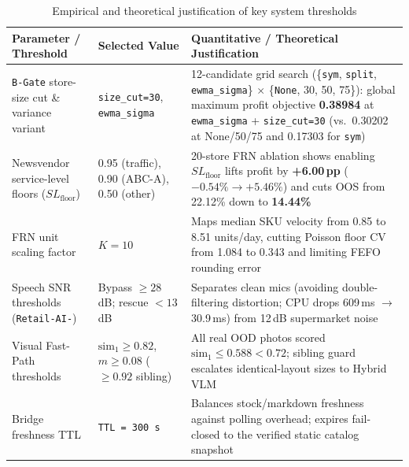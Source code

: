 \begin{table}[H]
\centering
\caption{Empirical and theoretical justification of key system thresholds}
\label{tab:threshold_justification}
\footnotesize
\begin{tabularx}{\textwidth}{L{3.5cm} L{2.3cm} Y}
\toprule
\textbf{Parameter / Threshold} & \textbf{Selected Value} & \textbf{Quantitative / Theoretical Justification} \\
\midrule
\texttt{B-Gate} store-size cut \& variance variant & \texttt{size\_cut=30}, \texttt{ewma\_sigma} & 12-candidate grid search (\{\texttt{sym}, \texttt{split}, \texttt{ewma\_sigma}\} $\times$ \{\texttt{None}, 30, 50, 75\}): global maximum profit objective \textbf{0.38984} at \texttt{ewma\_sigma} + \texttt{size\_cut=30} (vs.\ 0.30202 at None/50/75 and 0.17303 for \texttt{sym}) \\
Newsvendor service-level floors ($SL_{\text{floor}}$) & 0.95 (traffic), 0.90 (ABC-A), 0.50 (other) & 20-store FRN ablation shows enabling $SL_{\text{floor}}$ lifts profit by \textbf{+6.00\,pp} ($-0.54\% \to +5.46\%$) and cuts OOS from 22.12\% down to \textbf{14.44\%} \\
FRN unit scaling factor & $K = 10$ & Maps median SKU velocity from 0.85 to 8.51 units/day, cutting Poisson floor CV from 1.084 to 0.343 and limiting FEFO rounding error \\
Speech SNR thresholds (\texttt{Retail-AI-}) & Bypass $\ge 28$\,dB; rescue $< 13$\,dB & Separates clean mics (avoiding double-filtering distortion; CPU drops 609\,ms $\to$ 30.9\,ms) from 12\,dB supermarket noise \\
Visual Fast-Path thresholds & $\text{sim}_1 \ge 0.82$, $m \ge 0.08$ ($\ge 0.92$ sibling) & All real OOD photos scored $\text{sim}_1 \le 0.588 < 0.72$; sibling guard escalates identical-layout sizes to Hybrid VLM \\
Bridge freshness TTL & \texttt{TTL = 300\,s} & Balances stock/markdown freshness against polling overhead; expires fail-closed to the verified static catalog snapshot \\
\bottomrule
\end{tabularx}
\end{table}
